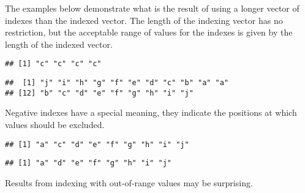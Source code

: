 \documentclass[paper=a4,headsepline,BCOR=12mm,twoside,open=right,%
titlepage,headings=small,fontsize=10pt,index=totoc,bibliography=totoc,%
captions=tableheading,captions=nooneline]{scrbook}\usepackage{knitr}
\begin{document}
The examples below demonstrate what is the result of using a longer vector of indexes than the indexed vector. The length of the indexing vector has no restriction, but the acceptable range of values for the indexes is given by the length of the indexed vector.

\begin{knitrout}\footnotesize
{}\color{fgcolor}\begin{kframe}
\begin{alltt}
\hlstd{a[}\hlstd{(}\hlstd{,}\hlstd{,}\hlstd{,}\hlstd{)]}
\end{alltt}
\begin{verbatim}
## [1] "c" "c" "c" "c"
\end{verbatim}
\begin{alltt}
\hlstd{a[}\hlstd{(}\hlopt{:}\hlstd{,} \hlopt{:}\hlstd{)]}
\end{alltt}
\begin{verbatim}
##  [1] "j" "i" "h" "g" "f" "e" "d" "c" "b" "a" "a"
## [12] "b" "c" "d" "e" "f" "g" "h" "i" "j"
\end{verbatim}
\end{kframe}
\end{knitrout}

Negative indexes have a special meaning, they indicate the positions at which values should be excluded.

\begin{knitrout}\footnotesize
{}\color{fgcolor}\begin{kframe}
\begin{alltt}
\hlstd{a[}\hlopt{-}\hlstd{]}
\end{alltt}
\begin{verbatim}
## [1] "a" "c" "d" "e" "f" "g" "h" "i" "j"
\end{verbatim}
\begin{alltt}
\hlstd{a[}\hlopt{-}\hlstd{(}\hlstd{,}\hlstd{)]}
\end{alltt}
\begin{verbatim}
## [1] "a" "d" "e" "f" "g" "h" "i" "j"
\end{verbatim}
\end{kframe}
\end{knitrout}

Results from indexing with out-of-range values may be surprising.
\end{document}
